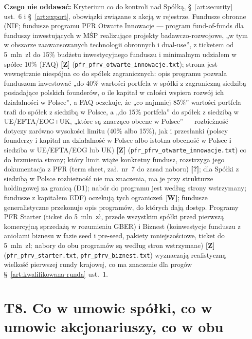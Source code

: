 \documentclass[12pt,a4paper]{report}
\newcommand{\Wiar}[1]{\textbf{[#1]}}
\begin{document}
\textbf{Czego nie oddawać:} Kryterium co do kontroli nad Spółką, §~\ref{art:security} ust.~6 i §~\ref{art:export}, obowiązki związane z akcją w rejestrze. Fundusze obronne (NIF; fundusze programu PFR Otwarte Innowacje --- program fund-of-funds dla funduszy inwestujących w MŚP realizujące projekty badawczo-rozwojowe, „w tym w obszarze zaawansowanych technologii obronnych i dual-use”, z ticketem od 5~mln~zł do 15\% budżetu inwestycyjnego funduszu i minimalnym udziałem w spółce 10\% (FAQ) \Wiar{Z} (\texttt{pfr\_pfrv\_otwarte\_innowacje.txt}); strona jest wewnętrznie niespójna co do spółek zagranicznych: opis programu pozwala funduszom inwestować „do 40\% wartości portfela w spółki z zagraniczną siedzibą posiadające polskich founderów, o ile kapitał w całości wspiera rozwój ich działalności w Polsce”, a FAQ oczekuje, że „co najmniej 85\%” wartości portfela trafi do spółek z siedzibą w Polsce, a „do 15\% portfela” do spółek z siedzibą w UE/EFTA/EOG+UK, „które są znacząco obecne w Polsce” --- rozbieżność dotyczy zarówno wysokości limitu (40\% albo 15\%), jak i przesłanki (polscy founderzy i kapitał na działalność w Polsce albo istotna obecność w Polsce i siedziba w UE/EFTA/EOG lub UK) \Wiar{Z} (\texttt{pfr\_pfrv\_otwarte\_innowacje.txt}) co do brzmienia strony; który limit wiąże konkretny fundusz, rozstrzyga jego dokumentacja z PFR (term sheet, zał.~nr~7 do zasad naboru) \Wiar{?}; dla Spółki z siedzibą w Polsce rozbieżność nie ma znaczenia, ma je przy strukturze holdingowej za granicą (D1); nabór do programu jest według strony wstrzymany; fundusze z kapitałem EDF) oczekują tych ograniczeń \Wiar{W}; fundusze generalistyczne przekonuje opis programów, do których dają dostęp. Programy PFR Starter (ticket do 5~mln~zł, przede wszystkim spółki przed pierwszą komercyjną sprzedażą w rozumieniu GBER) i Biznest (koinwestycje funduszu z aniołami biznesu w fazie seed i pre-seed, pakiety mniejszościowe, ticket do 5~mln~zł; nabory do obu programów są według stron wstrzymane) \Wiar{Z} (\texttt{pfr\_pfrv\_starter.txt}, \texttt{pfr\_pfrv\_biznest.txt}) wyznaczają realistyczną wielkość pierwszej rundy krajowej, co ma znaczenie dla progów §~\ref{art:kwalifikowana-runda} ust.~1.

\section*{T8. Co w umowie spółki, co w umowie akcjonariuszy, co w obu}
\end{document}
